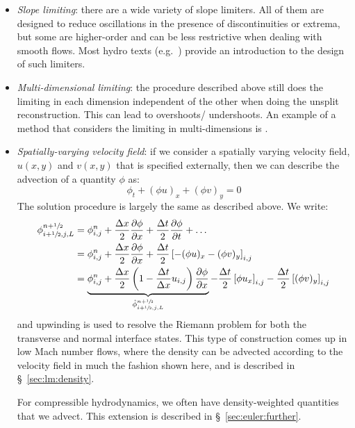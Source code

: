 \begin{itemize}

\item {\em Slope limiting}: there are a wide variety of slope
  limiters.  All of them are designed to reduce oscillations in the
  presence of discontinuities or extrema, but some are higher-order
  and can be less restrictive when dealing with smooth flows.  Most
  hydro texts (e.g.\ \cite{leveque:2002,toro:1997}) provide an
  introduction to the design of such limiters.

\item {\em Multi-dimensional limiting}: the procedure described above
  still does the limiting in each dimension independent of the other
  when doing the unsplit reconstruction.  This can lead to overshoots/
  undershoots.  An example of a method that considers the limiting
  in multi-dimensions is \cite{BDS,quadBDS}.

\item {\em Spatially-varying velocity field}: if we consider a spatially
  varying velocity field, $u(x,y)$ and $v(x,y)$ that is specified externally,
  then we can describe the advection of a quantity $\phi$ as:
  \begin{equation}
  \phi_t + (\phi u)_x + (\phi v)_y = 0
  \end{equation}
  The solution procedure is largely the same as described above.  We write:
\begin{align}
\phi_{i+\myhalf,j,L}^{n+\myhalf} &= \phi_{i,j}^n +
   \frac{\Delta x}{2} \frac{\partial \phi}{\partial x} +
   \frac{\Delta t}{2} \frac{\partial \phi}{\partial t} + \ldots \nonumber \\
%
 &= \phi_{i,j}^n +
    \frac{\Delta x}{2} \frac{\partial \phi}{\partial x} +
    \frac{\Delta t}{2} \left [ -(\phi u)_x -(\phi v)_y \right ]_{i,j} \nonumber\\
%
 &= \underbrace{\phi_{i,j}^n +
   \frac{\Delta x}{2} \left ( 1 - \frac{\Delta t}{\Delta x} u_{i,j} \right )
        \frac{\partial \phi}{\partial x}}_{\hat{\phi}_{i+\myhalf,j,L}^{n+\myhalf}}
   - \frac{\Delta t}{2} \left [\phi u_x \right ]_{i,j}
   - \frac{\Delta t}{2} \left [ (\phi v)_y \right ]_{i,j}
\end{align}
  and upwinding is used to resolve the Riemann problem for both the
  transverse and normal interface states.  This type of construction
  comes up in low Mach number flows, where the density can be advected
  according to the velocity field in much the fashion shown here, and
  is described in \S~\ref{sec:lm:density}.


  For compressible hydrodynamics, we often have density-weighted quantities
  that we advect.  This extension is described in \S~\ref{sec:euler:further}.

\end{itemize}


